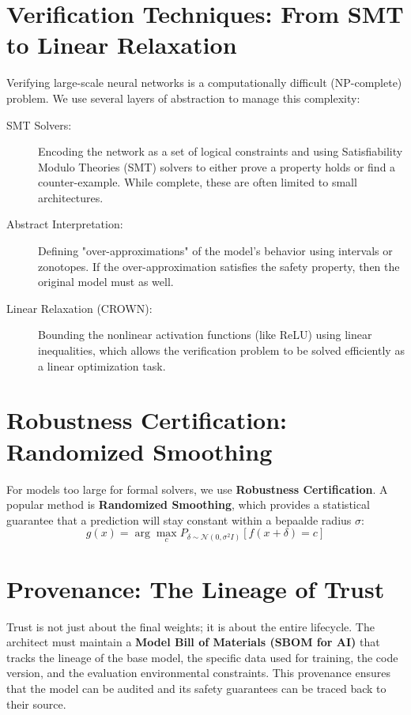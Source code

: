\section{Verification Techniques: From SMT to Linear Relaxation}
\label{sec:verification_tech_ch20}

Verifying large-scale neural networks is a computationally difficult (NP-complete) problem. We use several layers of abstraction to manage this complexity:

\begin{description}
  \item[SMT Solvers:] 
        Encoding the network as a set of logical constraints and using Satisfiability Modulo Theories (SMT) solvers to either prove a property holds or find a counter-example. While complete, these are often limited to small architectures.
  \item[Abstract Interpretation:]
        Defining "over-approximations" of the model's behavior using intervals or zonotopes. If the over-approximation satisfies the safety property, then the original model must as well.
  \item[Linear Relaxation (CROWN):]
        Bounding the nonlinear activation functions (like ReLU) using linear inequalities, which allows the verification problem to be solved efficiently as a linear optimization task.
\end{description}

\section{Robustness Certification: Randomized Smoothing}
\label{sec:randomized_smoothing_ch20}

For models too large for formal solvers, we use \textbf{Robustness Certification}. A popular method is \textbf{Randomized Smoothing}, which provides a statistical guarantee that a prediction will stay constant within a bepaalde radius $\sigma$:
\begin{equation}
g(x) = \arg\max_{c} P_{\delta \sim \mathcal{N}(0, \sigma^2 I)} [f(x+\delta) = c]
\end{equation}

\section{Provenance: The Lineage of Trust}
\label{sec:provenance_ch20}

Trust is not just about the final weights; it is about the entire lifecycle. The architect must maintain a \textbf{Model Bill of Materials (SBOM for AI)} that tracks the lineage of the base model, the specific data used for training, the code version, and the evaluation environmental constraints. This provenance ensures that the model can be audited and its safety guarantees can be traced back to their source.

